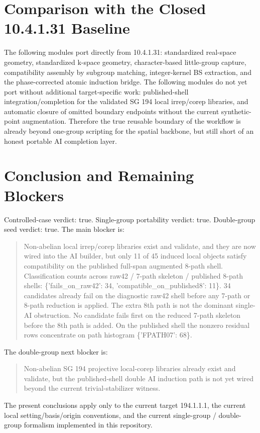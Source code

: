 \documentclass[11pt]{article}
\begin{document}
\section{Comparison with the Closed 10.4.1.31 Baseline}
The following modules port directly from 10.4.1.31: standardized real-space geometry, standardized k-space geometry, character-based little-group capture, compatibility assembly by subgroup matching, integer-kernel BS extraction, and the phase-corrected atomic induction bridge. The following modules do not yet port without additional target-specific work: published-shell integration/completion for the validated SG 194 local irrep/corep libraries, and automatic closure of omitted boundary endpoints without the current synthetic-point augmentation. Therefore the true reusable boundary of the workflow is already beyond one-group scripting for the spatial backbone, but still short of an honest portable AI completion layer.

\section{Conclusion and Remaining Blockers}
Controlled-case verdict: true. Single-group portability verdict: true. Double-group seed verdict: true. The main blocker is:
\begin{quote}
Non-abelian local irrep/corep libraries exist and validate, and they are now wired into the AI builder, but only 11 of 45 induced local objects satisfy compatibility on the published full-span augmented 8-path shell. Classification counts across raw42 / 7-path skeleton / published 8-path shells: \{'fails\_on\_raw42': 34, 'compatible\_on\_published8': 11\}. 34 candidates already fail on the diagnostic raw42 shell before any 7-path or 8-path reduction is applied. The extra 8th path is not the dominant single-AI obstruction. No candidate fails first on the reduced 7-path skeleton before the 8th path is added. On the published shell the nonzero residual rows concentrate on path histogram \{'FPATH07': 68\}.
\end{quote}
The double-group next blocker is:
\begin{quote}
Non-abelian SG 194 projective local-corep libraries already exist and validate, but the published-shell double AI induction path is not yet wired beyond the current trivial-stabilizer witness.
\end{quote}
The present conclusions apply only to the current target 194.1.1.1, the current local setting/basis/origin conventions, and the current single-group / double-group formalism implemented in this repository.
\end{document}
